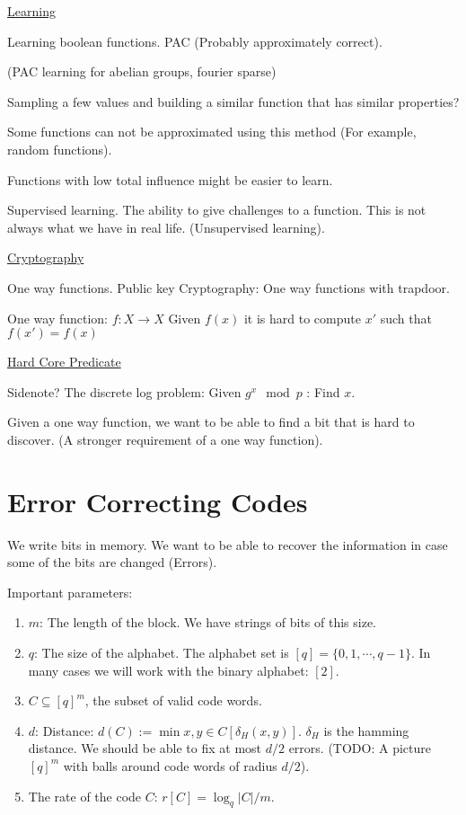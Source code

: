 \uline{Learning}

Learning boolean functions.
PAC (Probably approximately correct).

(PAC learning for abelian groups, fourier sparse)

Sampling a few values and building a similar function that has similar
properties?

Some functions can not be approximated using this method (For example, random
functions).

Functions with low total influence might be easier to learn.

Supervised learning. The ability to give challenges to a function. This is not
always what we have in real life. (Unsupervised learning).

\uline{Cryptography}

One way functions. Public key Cryptography: One way functions with trapdoor.

\begin{defn}
One way function: $f: X \rightarrow X$
Given $f(x)$ it is hard to compute $x'$ such that $f(x')=f(x)$
\end{defn}


\uline{Hard Core Predicate}

Sidenote?
The discrete log problem:
Given $g^x \mod p$ : Find $x$.

Given a one way function, we want to be able to find a bit that is hard to
discover. (A stronger requirement of a one way function).

\part{Error Correcting Codes}

We write bits in memory. We want to be able to recover the information in case
some of the bits are changed (Errors).

Important parameters: 
\begin{enumerate}
  \item $m$: The length of the block. We have strings of bits of this size.
  \item $q$: The size of the alphabet. The alphabet set is $[q] =
    \{0,1,\cdots,q-1\}$. In many cases we will work with the binary alphabet:
    $[2]$.
  \item $C \subseteq [q]^m$, the subset of valid code words.
  \item $d$: Distance: $d(C) := \min{x,y \in C}[{\delta}_H (x,y)]$. ${\delta}_H$
    is the hamming distance. We should be able to fix at most $d/2$ errors.
    (TODO: A picture $[q]^m$ with balls around code words of radius $d/2$).

  \item The rate of the code $C$: $r[C] = \log_{q}{|C|} / m$.
\end{enumerate}


